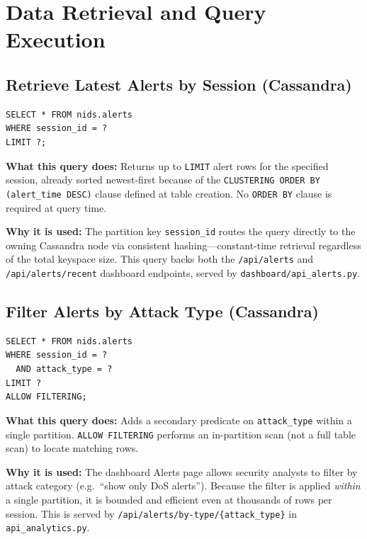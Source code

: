 \documentclass[12pt,a4paper]{report}
\begin{document}
\section{Data Retrieval and Query Execution}

\subsection{Retrieve Latest Alerts by Session (Cassandra)}
\begin{lstlisting}[style=cqlstyle,
  caption={CQL: Retrieve the latest alerts for a session},
  label={lst:select-alerts}]
SELECT * FROM nids.alerts
WHERE session_id = ?
LIMIT ?;
\end{lstlisting}

\textbf{What this query does:}  Returns up to \texttt{LIMIT} alert rows for
the specified session, already sorted newest-first because of the
\texttt{CLUSTERING ORDER BY (alert\_time DESC)} clause defined at table
creation.  No \texttt{ORDER BY} clause is required at query time.

\textbf{Why it is used:}  The partition key \texttt{session\_id} routes the
query directly to the owning Cassandra node via consistent hashing---constant-time
retrieval regardless of the total keyspace size.  This query backs both the
\texttt{/api/alerts} and \texttt{/api/alerts/recent} dashboard endpoints,
served by \texttt{dashboard/api\_alerts.py}.

\subsection{Filter Alerts by Attack Type (Cassandra)}
\begin{lstlisting}[style=cqlstyle,
  caption={CQL: Filter alerts within a session by attack type},
  label={lst:select-by-type}]
SELECT * FROM nids.alerts
WHERE session_id = ?
  AND attack_type = ?
LIMIT ?
ALLOW FILTERING;
\end{lstlisting}

\textbf{What this query does:}  Adds a secondary predicate on
\texttt{attack\_type} within a single partition.
\texttt{ALLOW FILTERING} performs an in-partition scan (not a full table scan)
to locate matching rows.

\textbf{Why it is used:}  The dashboard Alerts page allows security analysts
to filter by attack category (e.g.\ ``show only DoS alerts'').  Because the
filter is applied \textit{within} a single partition, it is bounded and
efficient even at thousands of rows per session.  This is served by
\texttt{/api/alerts/by-type/\{attack\_type\}} in
\texttt{api\_analytics.py}.
\end{document}
